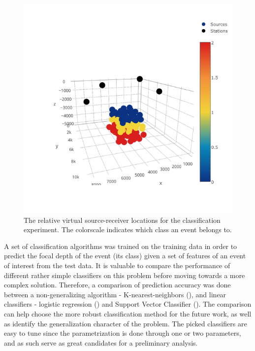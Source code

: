 \begin{figure}[b!]
\begin{center}
\includegraphics[width=0.85\linewidth,angle=0]{./AntonBiryukov_bibtex/figure_foxcreek_classes.png}
\end{center}
\vspace{-4mm}
\caption{The relative virtual source-receiver locations for the classification experiment. The colorscale indicates which class an event belongs to.}
\label{fig:foxcreek_classes}
\end{figure}

A set of classification algorithms was trained on the training data in order to predict the focal depth of the event (its class) given a set of features of an event of interest from the test data. It is valuable to compare the performance of different rather simple classifiers on this problem before moving towards a more complex solution. Therefore, a comparison of prediction accuracy was done between a non-generalizing algorithm - K-nearest-neighbors (\cite{cover_nearest_1967}), and linear classifiers - logistic regression (\cite{jr_applied_2004}) and Support Vector Classifier (\cite{suykens_least_1999}). The comparison can help choose the more robust classification method for the future work, as well as identify the generalization character of the problem. The picked classifiers are easy to tune since the parametrization is done through one or two parameters, and as such serve as great candidates for a preliminary analysis. 


